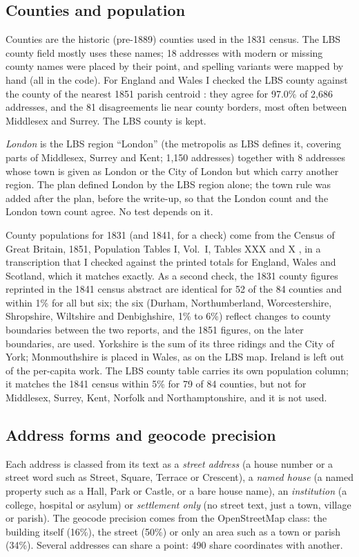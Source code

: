 \documentclass[11pt,a4paper]{article}
\begin{document}
\subsection{Counties and population}
Counties are the historic (pre-1889) counties used in the 1831 census. The LBS county field mostly uses these names; 18 addresses with modern or missing county names were placed by their point, and spelling variants were mapped by hand (all in the code). For England and Wales I checked the LBS county against the county of the nearest 1851 parish centroid \citep{caprettini2020}: they agree for 97.0\% of 2,686 addresses, and the 81 disagreements lie near county borders, most often between Middlesex and Surrey. The LBS county is kept.

\textit{London} is the LBS region ``London'' (the metropolis as LBS defines it, covering parts of Middlesex, Surrey and Kent; 1,150 addresses) together with 8 addresses whose town is given as London or the City of London but which carry another region. The plan defined London by the LBS region alone; the town rule was added after the plan, before the write-up, so that the London count and the London town count agree. No test depends on it.

County populations for 1831 (and 1841, for a check) come from the Census of Great Britain, 1851, Population Tables I, Vol.~I, Tables XXX and X \citep{census1851}, in a transcription \citep{ditto2026} that I checked against the printed totals for England, Wales and Scotland, which it matches exactly. As a second check, the 1831 county figures reprinted in the 1841 census abstract \citep{vob2026} are identical for 52 of the 84 counties and within 1\% for all but six; the six (Durham, Northumberland, Worcestershire, Shropshire, Wiltshire and Denbighshire, 1\% to 6\%) reflect changes to county boundaries between the two reports, and the 1851 figures, on the later boundaries, are used. Yorkshire is the sum of its three ridings and the City of York; Monmouthshire is placed in Wales, as on the LBS map. Ireland is left out of the per-capita work. The LBS county table carries its own population column; it matches the 1841 census within 5\% for 79 of 84 counties, but not for Middlesex, Surrey, Kent, Norfolk and Northamptonshire, and it is not used.

\subsection{Address forms and geocode precision}
Each address is classed from its text as a \textit{street address} (a house number or a street word such as Street, Square, Terrace or Crescent), a \textit{named house} (a named property such as a Hall, Park or Castle, or a bare house name), an \textit{institution} (a college, hospital or asylum) or \textit{settlement only} (no street text, just a town, village or parish). The geocode precision comes from the OpenStreetMap class: the building itself (16\%), the street (50\%) or only an area such as a town or parish (34\%). Several addresses can share a point: 490 share coordinates with another.
\end{document}
